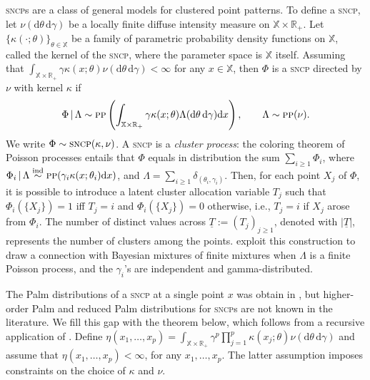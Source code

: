 \documentclass[11pt,a4paper,oneside]{article}
\newcommand{\ind}{\stackrel{\mbox{\scriptsize ind}}{\sim}}
\newcommand{\calT}{\mathcal{T}}
\newcommand{\dd}{\mathrm d}
\newcommand{\X}{\mathbb{X}}
\newcommand{\R}{\mathbb{R}}
\renewcommand{\mid}{\ensuremath{\,|\,}}
\theoremstyle{definition}
\theoremstyle{remark}
\begin{document}
\textsc{sncp}s are a class of general models for clustered point patterns.
To define a \textsc{sncp},  let $\nu(\dd \theta \, \dd \gamma)$ be a locally finite diffuse intensity measure on $\X \times\R_+$. Let $\{\kappa(\cdot; \theta)\}_{\theta \in \X}$ be a family of parametric probability density functions on $\X$, called the kernel of the \textsc{sncp}, where the parameter space is $\X$ itself.
Assuming that $\int_{\X\times \R_+} \gamma \kappa(x; \theta) \nu(\dd \theta \, \dd \gamma) < \infty$ for any $x \in \X$, then $\Phi$ is a \textsc{sncp} directed by $\nu$ with kernel $\kappa$ if 
\begin{equation}\label{eq:sncp_definition}
    \Phi \mid \Lambda \sim \textsc{pp}\left(\int_{\X\times \R_+} \gamma \kappa(x; \theta) \Lambda(\dd \theta \, \dd \gamma) \dd x\right), \qquad \Lambda \sim \textsc{pp}(\nu).
\end{equation}
We write $\Phi \sim \textsc{sncp}(\kappa, \nu)$.
A \textsc{sncp} is a \emph{cluster process}: the coloring theorem of Poisson processes entails that $\Phi$ equals in distribution the sum $\sum_{i \geq 1} \Phi_i$, where $\Phi_i \mid \Lambda \ind \textsc{pp}(\gamma_i \kappa(x; \theta_i) \dd x)$, and $\Lambda = \sum_{i \geq 1} \delta_{(\theta_i, \gamma_i)}$. 
Then, for each point $X_j$ of $\Phi$, it is possible to introduce a latent cluster allocation variable $T_j$ such that $\Phi_i(\{X_j\}) = 1$ iff $T_j = i$ and $\Phi_i(\{X_j\}) = 0$ otherwise, i.e., $T_j = i$ if $X_j$ arose from $\Phi_i$. 
The number of distinct values across $\underline{T} := (T_j)_{j\geq 1}$, denoted with $|\underline{T}|$, represents the number of clusters among the points. 
\cite{wang2023spatiotemporal} exploit this construction to draw a connection with Bayesian mixtures of finite mixtures \citep{Lijoi08,miller2018mixture} when $\Lambda$ is a finite Poisson process, and the $\gamma_i$'s are independent and gamma-distributed.

The Palm distributions of a \textsc{sncp} at a single point $x$ was obtain in \cite{Mo03Cox}, but higher-order Palm and reduced Palm distributions for \textsc{sncp}s are not known in the literature. We fill this gap with the theorem below, which follows from a recursive application of . 
Define $\eta(x_1, \ldots, x_p) = \int_{\X\times \R_+} \gamma^{p} \prod_{j=1}^p \kappa(x_j; \theta) \nu(\dd \theta\, \dd \gamma)$ and assume that $\eta(x_1, \ldots, x_p) < \infty$, for any $x_1, \ldots, x_p$. The latter assumption imposes constraints on the choice of $\kappa$ and $   \nu$.  %
\end{document}
